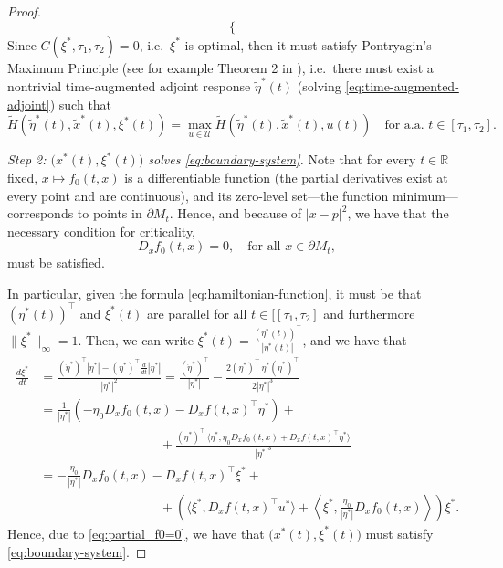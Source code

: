 \documentclass[reqno]{amsart}
\theoremstyle{definition}
\numberwithin{equation}{section}
\newcommand{\R}{\mathbb{R}}
\newcommand{\U}{\mathcal{U}}
\begin{document}
\begin{proof}
\begin{equation}
\begin{cases}
\end{cases}
\end{equation}
Since $C(\xi^*,\tau_1,\tau_2)=0$, i.e.~$\xi^*$ is optimal, then it must satisfy Pontryagin's Maximum Principle (see for example Theorem 2 in \cite{clarke2010pontryagin}), i.e.~there must exist a nontrivial time-augmented adjoint response $\widetilde \eta^*(t)$ (solving \eqref{eq:time-augmented-adjoint}) such that
\begin{equation}\label{eq:PMP}
\widetilde H(\widetilde \eta^*(t),\widetilde x^*(t),\xi^*(t))=\max_{u\in\U}\widetilde H(\widetilde \eta^*(t),\widetilde x^*(t),u(t))\quad \text{for a.a.~} t\in [\tau_1,\tau_2]. 
\end{equation}  

\emph{Step 2: $\big(x^*(t),\xi^*(t)\big)$ solves \eqref{eq:boundary-system}.}
Note that for every $t\in\R$ fixed, $x\mapsto f_0(t,x)$ is a differentiable function (the partial derivatives exist at every point and are continuous), and its zero-level set---the function minimum---corresponds to points in $\partial M_t$. Hence, and because of $|x-p|^2$, we have that the necessary condition for criticality,
\begin{equation}\label{eq:partial_f0=0}
D_xf_0(t,x)=0,\quad \text{for all } x\in\partial M_t,
\end{equation}
must be satisfied. 

In particular, given the formula \eqref{eq:hamiltonian-function}, it must be that $(\eta^*(t))^\top$ and $\xi^*(t)$ are parallel for all $t\in[[\tau_1,\tau_2]$ and furthermore $\|\xi^*\|_\infty=1$. Then, we can write $\xi^*(t)=\tfrac{(\eta^*(t))^\top}{|\eta^*(t)|}$, and  we have that 
\[
\begin{split}
\frac{d \xi^*}{dt}&=\frac{(\dot \eta^*)^\top|\eta^*|-(\eta^*)^\top\frac{d}{dt}|\eta^*|}{|\eta^*|^2}
=\frac{(\dot \eta^*)^\top}{|\eta^*|}-\frac{2(\eta^*)^\top\,\eta^*(\dot \eta^*)^\top}{2|\eta^*|^3}\\[1ex]
&=\frac{1}{|\eta^*|}\left(-\eta_0D_x f_0(t,x)-D_xf(t,x)^\top \eta^*\right)+\\
&\qquad\qquad\qquad\qquad\quad\ \, +\frac{(\eta^*)^\top\,\langle \eta^*,\eta_0D_x f_0(t,x)+D_xf(t,x)^\top \eta^*\rangle}{|\eta^*|^3}\\
&=-\frac{\eta_0}{|\eta^*|}D_x f_0(t,x)-D_xf(t,x)^\top \xi^*+\\
&\qquad\qquad\qquad\qquad\quad\ \, +\left(\langle  \xi^*,D_xf(t,x)^\top u^*\rangle +\left\langle  \xi^*,\frac{\eta_0}{|\eta^*|} D_x f_0(t,x)\right\rangle\right)  \xi^*.
\end{split}
\]
Hence, due to \eqref{eq:partial_f0=0}, we have that $\big(x^*(t),\xi^*(t)\big)$ must satisfy \eqref{eq:boundary-system}. 
\end{proof}
\end{document}
